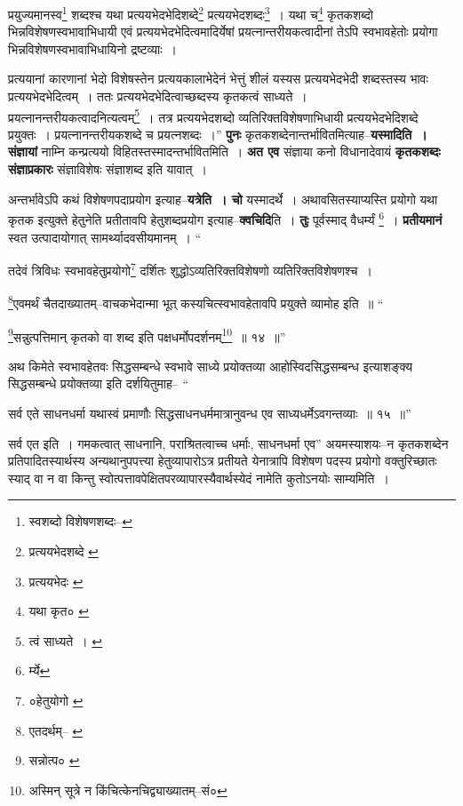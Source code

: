 \documentclass[article,12pt,a4paper]{memoir}
\begin{document}
	प्रयुज्यमानस्व\footnote{स्वशब्दो विशेषणशब्दः--\cite{dp-msD-n}} शब्दश्च यथा प्रत्ययभेदभेदिशब्दे\footnote{प्रत्ययभेदशब्दे \cite{dp-msB}} प्रत्ययभेदशब्दः\footnote{प्रत्ययभेदः \cite{dp-msA} \cite{dp-msB} \cite{dp-edP} \cite{dp-edH} \cite{dp-edE} \cite{dp-edN}} । यथा च\footnote{यथा कृत० \cite{dp-msC}} कृतकशब्दो भिन्नविशेषणस्वभावाभिधायी एवं प्रत्ययभेदभेदित्वमादिर्येषां प्रयत्नान्तरीयकत्वादीनां तेऽपि स्वभावहेतोः प्रयोगा भिन्नविशेषणस्वभावाभिधायिनो द्रष्टव्याः । 
	  
	प्रत्ययानां कारणानां भेदो विशेषस्तेन प्रत्ययकालाभेदेनं भेत्तुं शीलं यस्यस प्रत्ययभेदभेदी शब्दस्तस्य भावः प्रत्ययभेदभेदित्वम् । ततः प्रत्ययभेदभेदित्वाच्छब्दस्य कृतकत्वं साध्यते । प्रयत्नानन्तरीयकत्वादनित्यत्वम्\footnote{त्वं साध्यते । \cite{dp-msA} \cite{dp-edP} \cite{dp-edH} \cite{dp-edE} \cite{dp-edN}} । तत्र प्रत्ययभेदशब्दो व्यतिरिक्तविशेषणाभिधायी प्रत्ययभेदभेदिशब्दे प्रयुक्तः । प्रयत्नानन्तरीयकशब्दे च प्रयत्नशब्दः ।” \textbf{पुनः} कृतकशब्देनान्तर्भावितमित्याह--\textbf{यस्मादिति । संज्ञायां} नाम्नि कन्प्रत्ययो विहितस्तस्मादन्तर्भावितमिति । \textbf{अत एव} संज्ञाया कनो विधानादेवायं \textbf{कृतकशब्दः संज्ञाप्रकारः} संज्ञाविशेषः संज्ञाशब्द इति यावात् ।
	\pend
      

	  \pstart अन्तर्भावेऽपि कथं विशेषणपदाप्रयोग इत्याह--\textbf{यत्रेति । चो} यस्मादर्थे । अथावसितस्याप्यस्ति प्रयोगो यथा कृतक इत्युक्ते हेतुनेति प्रतीतावपि हेतुशब्दप्रयोग इत्याह--\textbf{क्वचिदि}ति । \textbf{तुः} पूर्वस्माद् वैधर्म्यं \footnote{र्म्ये} । \textbf{प्रतीयमानं} स्वत उत्पादायोगात् सामर्थ्यादवसीयमानम् ।  \leavevmode{} “
	  
	तदेवं त्रिविधः स्वभावहेतुप्रयोगो\footnote{०हेतुयोगो \cite{dp-msB}} दर्शितः शुद्धोऽव्यतिरिक्तविशेषणो व्यतिरिक्तविशेषणश्च । 
	  
	\footnote{एतदर्थम्--\cite{dp-msB} \cite{dp-msD}}\-एवमर्थं चैतदाख्यातम्--वाचकभेदान्मा भूत् कस्यचित्स्वभावहेतावपि प्रयुक्ते व्यामोह इति ॥ “
	  
	\footnote{सन्नोत्प० \cite{dp-edE}}\-सन्नुत्पत्तिमान् कृतको वा शब्द इति पक्षधर्मोपदर्शनम्\footnote{अस्मिन् सूत्रे न किंचित्केनचिद्व्याख्यातम्--सं०} ॥ १४ ॥” 
	  
	अथ किमेते स्वभावहेतवः सिद्धसम्बन्धे स्वभावे साध्ये प्रयोक्तव्या आहोस्विदसिद्धसम्बन्ध इत्याशङ्क्य सिद्धसम्बन्धे प्रयोक्तव्या इति दर्शयितुमाह-- “
	  
	सर्व एते साधनधर्मा यथास्वं प्रमाणौः सिद्धसाधनधर्ममात्रानुवन्ध एव साध्यधर्मेऽवगन्तव्याः ॥ १५ ॥” 
	  
	सर्व एत इति । गमकत्वात् साधनानि, पराश्रितत्वाच्च धर्माः, साधनधर्मा एव” अयमस्याशयः--न कृतकशब्देन प्रतिपादितस्यार्थस्य अन्यथानुपपत्त्या हेतुव्यापारोऽत्र प्रतीयते येनात्रापि विशेषण \leavevmode{} पदस्य प्रयोगो वक्तुरिच्छातः स्याद् वा न वा किन्तु स्वोत्पत्तावपेक्षितपरव्यापारस्यैवार्थस्येदं नामेति कुतोऽनयोः साम्यमिति ।
	\pend
      
\end{document}
